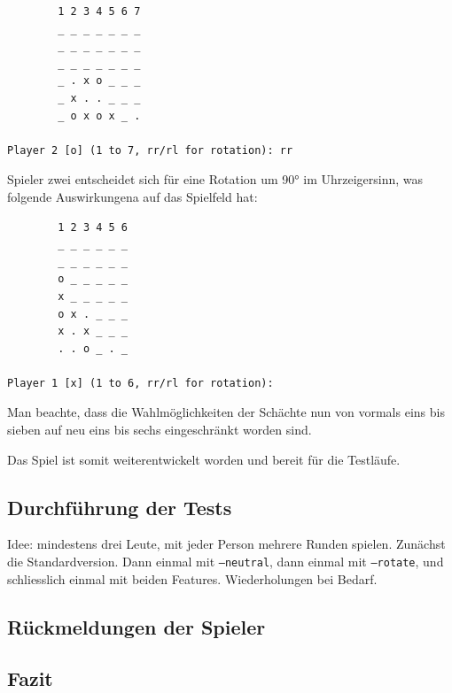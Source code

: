 \documentclass[a4paper,11pt,hidelinks]{scrartcl}
\begin{document}
\begin{lstlisting}
        1 2 3 4 5 6 7
        _ _ _ _ _ _ _
        _ _ _ _ _ _ _
        _ _ _ _ _ _ _
        _ . x o _ _ _
        _ x . . _ _ _
        _ o x o x _ .

Player 2 [o] (1 to 7, rr/rl for rotation): rr
\end{lstlisting}

Spieler zwei entscheidet sich für eine Rotation um 90° im Uhrzeigersinn, was folgende Auswirkungena auf das Spielfeld hat:

\begin{lstlisting}
        1 2 3 4 5 6
        _ _ _ _ _ _
        _ _ _ _ _ _
        o _ _ _ _ _
        x _ _ _ _ _
        o x . _ _ _
        x . x _ _ _
        . . o _ . _

Player 1 [x] (1 to 6, rr/rl for rotation):
\end{lstlisting}

Man beachte, dass die Wahlmöglichkeiten der Schächte nun von vormals eins bis sieben auf neu eins bis sechs eingeschränkt worden sind.

Das Spiel ist somit weiterentwickelt worden und bereit für die Testläufe.

\subsection{Durchführung der Tests}

Idee: mindestens drei Leute, mit jeder Person mehrere Runden spielen. Zunächst die Standardversion. Dann einmal mit \texttt{--neutral}, dann einmal mit \texttt{--rotate}, und schliesslich einmal mit beiden Features. Wiederholungen bei Bedarf.

\subsection{Rückmeldungen der Spieler}

\subsection{Fazit}

\newpage

\listoffigures
{}
\end{document}
